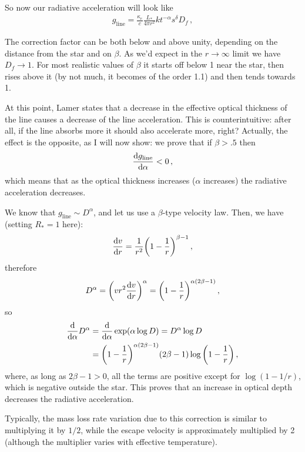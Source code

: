 \documentclass[main.tex]{subfiles}
\begin{document}
So now our radiative acceleration will look like 
%
\begin{align}
g _{\text{line}} = \frac{\kappa_{e}}{c}\frac{L_{*}}{4 \pi r^2} k t^{-\alpha } s^{ \delta } D_f
\,,
\end{align}
%


The correction factor can be both below and above unity, depending on the distance from the star and on \(\beta \). 
As we'd expect in the \(r \rightarrow \infty \) limit we have \(D_f \rightarrow 1\). 
For most realistic values of \(\beta \) it starts off below 1 near the star, then rises above it (by not much, it becomes of the order \num{1.1}) and then tends towards 1.

\begin{bluebox}
At this point, Lamer states that a decrease in the effective optical thickness of the line causes a decrease of the line acceleration. 
This is counterintuitive: after all, if the line absorbs more it should also accelerate more, right?
Actually, the effect is the opposite, as I will now show: we prove that if \(\beta > \num{.5}\) then
%
\begin{align}
\dv{g _{\text{line}}}{\alpha } < 0
\,,
\end{align}
%
which means that as the optical thickness increases (\(\alpha \) increases) the radiative acceleration decreases.

We know that \(g _{\text{line}} \sim D^{\alpha }\), and let us use a \(\beta \)-type velocity law. Then, we have (setting \(R_{*} =1\) here):
%
\begin{align}
\dv{v}{r} = \frac{1}{r^2} \qty(1 - \frac{1}{r})^{\beta -1}
\,,
\end{align}
%
therefore 
%
\begin{align}
D^{\alpha } = \qty(v r^2 \dv{v}{r})^{\alpha}
= \qty(1 - \frac{1}{r})^{\alpha (2\beta -1)}
\,,
\end{align}
%
so 
%
\begin{align}
\dv{}{\alpha } D^{\alpha }
&= \dv{}{\alpha } \exp(\alpha \log D)
= D^{\alpha } \log D  \\
&= \qty(1 - \frac{1}{r})^{\alpha (2 \beta -1)}
(2 \beta -1 ) \log \qty(1 - \frac{1}{r})
\,,
\end{align}
%
where, as long as \(2 \beta -1 >0\), all the terms are positive except for \(\log (1 - 1/r)\), which is negative outside the star.
This proves that an increase in optical depth decreases the radiative acceleration.
\end{bluebox}

Typically, the mass loss rate variation due to this correction is similar to multiplying it by \(1/2\), while the escape velocity is approximately multiplied by 2 (although the multiplier varies with effective temperature).
\end{document}

